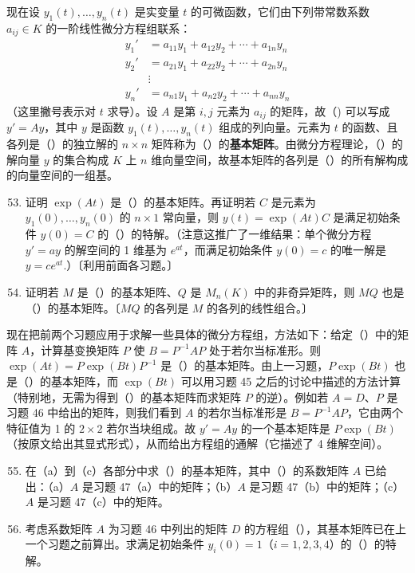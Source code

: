 \noindent 现在设 \(y_1(t), \ldots, y_n(t)\) 是实变量 \(t\) 的可微函数，它们由下列带常数系数 \(a_{ij} \in K\) 的一阶线性微分方程组联系：
\[
\begin{aligned}
y_1' &= a_{11}y_1+a_{12}y_2+\cdots+a_{1n}y_n\\
y_2' &= a_{21}y_1+a_{22}y_2+\cdots+a_{2n}y_n\\
&\vdots\\
y_n' &= a_{n1}y_1+a_{n2}y_2+\cdots+a_{nn}y_n
\end{aligned}
\]
（这里撇号表示对 \(t\) 求导）。设 \(A\) 是第 \(i, j\) 元素为 \(a_{ij}\) 的矩阵，故（\*) 可以写成 \(y' = Ay\)，其中 \(y\) 是函数 \(y_1(t), \ldots, y_n(t)\) 组成的列向量。元素为 \(t\) 的函数、且各列是（\*）的独立解的 \(n \times n\) 矩阵称为（\*）的\textbf{基本矩阵}。由微分方程理论，（\*）的解向量 \(y\) 的集合构成 \(K\) 上 \(n\) 维向量空间，故基本矩阵的各列是（\*）的所有解构成的向量空间的一组基。

\begin{enumerate}
\setcounter{enumi}{52}
\item 证明 \(\exp(At)\) 是（\*）的基本矩阵。再证明若 \(C\) 是元素为 \(y_1(0), \ldots, y_n(0)\) 的 \(n \times 1\) 常向量，则 \(y(t) = \exp(At)C\) 是满足初始条件 \(y(0) = C\) 的（\*）的特解。（注意这推广了一维结果：单个微分方程 \(y' = ay\) 的解空间的 1 维基为 \(e^{at}\)，而满足初始条件 \(y(0) = c\) 的唯一解是 \(y = ce^{at}\).）〔利用前面各习题。〕

\item 证明若 \(M\) 是（\*）的基本矩阵、\(Q\) 是 \(M_n(K)\) 中的非奇异矩阵，则 \(MQ\) 也是（\*）的基本矩阵。〔\(MQ\) 的各列是 \(M\) 的各列的线性组合。〕
\end{enumerate}

\noindent 现在把前两个习题应用于求解一些具体的微分方程组，方法如下：给定（\*）中的矩阵 \(A\)，计算基变换矩阵 \(P\) 使 \(B = P^{-1}AP\) 处于若尔当标准形。则 \(\exp(At) = P\exp(Bt)P^{-1}\) 是（\*）的基本矩阵。由上一习题，\(P\exp(Bt)\) 也是（\*）的基本矩阵，而 \(\exp(Bt)\) 可以用习题 45 之后的讨论中描述的方法计算（特别地，无需为得到（\*）的基本矩阵而求矩阵 \(P\) 的逆）。例如若 \(A = D\)、\(P\) 是习题 46 中给出的矩阵，则我们看到 \(A\) 的若尔当标准形是 \(B = P^{-1}AP\)，它由两个特征值为 1 的 \(2 \times 2\) 若尔当块组成。故 \(y' = Ay\) 的一个基本矩阵是 \(P\exp(Bt)\)（按原文给出其显式形式），从而给出方程组的通解（它描述了 4 维解空间）。

\begin{enumerate}
\setcounter{enumi}{54}
\item 在（a）到（c）各部分中求（\*）的基本矩阵，其中（\*）的系数矩阵 \(A\) 已给出：（a）\(A\) 是习题 47（a）中的矩阵；（b）\(A\) 是习题 47（b）中的矩阵；（c）\(A\) 是习题 47（c）中的矩阵。

\item 考虑系数矩阵 \(A\) 为习题 46 中列出的矩阵 \(D\) 的方程组（\*），其基本矩阵已在上一个习题之前算出。求满足初始条件 \(y_i(0) = 1\)（\(i = 1, 2, 3, 4\)）的（\*）的特解。
\end{enumerate}

